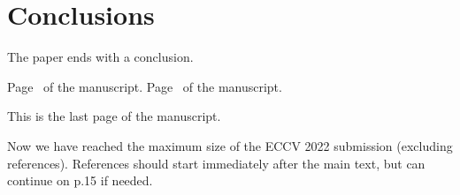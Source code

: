 \documentclass[runningheads]{llncs}
\begin{document}
\section{Conclusions}

The paper ends with a conclusion. 


\clearpage\mbox{}Page \thepage\ of the manuscript.
\clearpage\mbox{}Page \thepage\ of the manuscript.

This is the last page of the manuscript.
\par\vfill\par
Now we have reached the maximum size of the ECCV 2022 submission (excluding references).
References should start immediately after the main text, but can continue on p.15 if needed.

\clearpage


\end{document}
